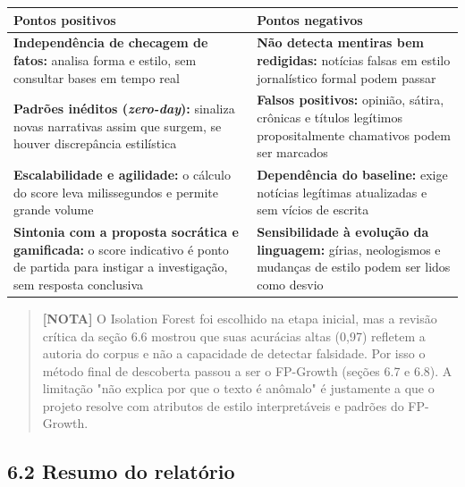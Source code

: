 \documentclass[
  brazilian,
  11pt,
]{article}
\newcounter{none} %
\begin{document}
{\def\LTcaptype{none} %
\begin{longtable}[]{@{}
  >{\raggedright\arraybackslash}p{}
  >{\raggedright\arraybackslash}p{}@{}}
\toprule\noalign{}
\begin{minipage}[b]{\linewidth}\raggedright
Pontos positivos
\end{minipage} & \begin{minipage}[b]{\linewidth}\raggedright
Pontos negativos
\end{minipage} \\
\midrule\noalign{}
\endhead
\bottomrule\noalign{}
\endlastfoot
\textbf{Independência de checagem de fatos:} analisa forma e estilo, sem consultar bases em tempo real & \textbf{Não detecta mentiras bem redigidas:} notícias falsas em estilo jornalístico formal podem passar \\
\textbf{Padrões inéditos (\emph{zero-day}):} sinaliza novas narrativas assim que surgem, se houver discrepância estilística & \textbf{Falsos positivos:} opinião, sátira, crônicas e títulos legítimos propositalmente chamativos podem ser marcados \\
\textbf{Escalabilidade e agilidade:} o cálculo do score leva milissegundos e permite grande volume & \textbf{Dependência do baseline:} exige notícias legítimas atualizadas e sem vícios de escrita \\
\textbf{Sintonia com a proposta socrática e gamificada:} o score indicativo é ponto de partida para instigar a investigação, sem resposta conclusiva & \textbf{Sensibilidade à evolução da linguagem:} gírias, neologismos e mudanças de estilo podem ser lidos como desvio \\
\end{longtable}
}

\begin{quote}
\textbf{{[}NOTA{]}} O Isolation Forest foi escolhido na etapa inicial, mas a revisão crítica da seção 6.6 mostrou que suas acurácias altas (0,97) refletem a autoria do corpus e não a capacidade de detectar falsidade. Por isso o método final de descoberta passou a ser o FP-Growth (seções 6.7 e 6.8). A limitação "não explica por que o texto é anômalo" é justamente a que o projeto resolve com atributos de estilo interpretáveis e padrões do FP-Growth.
\end{quote}

\subsection{6.2 Resumo do relatório}\label{resumo-do-relatuxf3rio}
\end{document}

